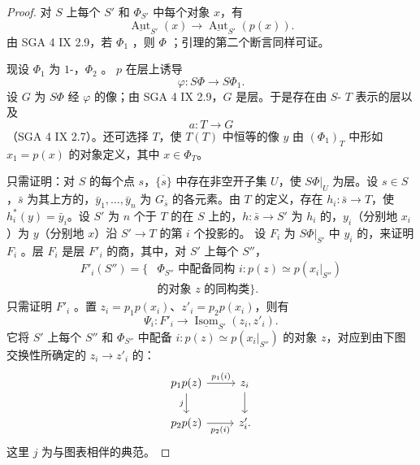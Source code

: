 \begin{proof}
对 $S$ 上每个 $S'$ 和 $\Phi_{S'}$ 中每个对象 $x$，有
\[\underline{\operatorname{Aut}}_{S'}(x)\longrightarrow\underline{\operatorname{Aut}}_{S'}(p(x)).\]
由 SGA 4 IX 2.9，若 $\Phi_1$ ，则 $\Phi$ ；引理的第二个断言同样可证。

现设 $\Phi_1$ 为 $1$-，$\Phi_2$ 。 $p$ 在层上诱导
\[\varphi:S\Phi\longrightarrow S\Phi_1.\]
设 $G$ 为 $S\Phi$ 经 $\varphi$ 的像；由 SGA 4 IX 2.9，$G$ 是层。于是存在由 $S$- $T$ 表示的层以及
\[a:T\longrightarrow G\]
（SGA 4 IX 2.7）。还可选择 $T$，使 $T(T)$ 中恒等的像 $y$ 由 $(\Phi_1)_T$ 中形如 $x_1=p(x)$ 的对象定义，其中 $x\in\Phi_T$。

只需证明：对 $S$ 的每个点 $s$，$\overline{\{s\}}$ 中存在非空开子集 $U$，使 $S\Phi|_U$ 为层。设 $s\in S$，$\bar s$ 为其上方的，$\bar y_1,\ldots,\bar y_n$ 为 $G_{\bar s}$ 的各元素。由 $T$ 的定义，存在 $h_i:\bar s\to T$，使 $h_i^*(y)=\bar y_i$。设 $S'$ 为 $n$ 个于 $T$ 的在 $S$ 上的，$h:\bar s\to S'$ 为 $h_i$ 的，$y_i$（分别地 $x_i$）为 $y$（分别地 $x$）沿 $S'\to T$ 的第 $i$ 个投影的。
设 $F_i$ 为 $S\Phi|_{S'}$ 中 $y_i$ 的，来证明 $F_i$ 。层 $F_i$ 是层 $F'_i$ 的商，其中，对 $S'$ 上每个 $S''$，
\[
\begin{aligned}
F'_i(S'')=\{&\Phi_{S''}\text{ 中配备同构 }i:p(z)\simeq p(x_i|_{S''})\\
&\text{的对象 }z\text{ 的同构类}\}.
\end{aligned}
\]
只需证明 $F'_i$ 。置 $z_i=p_1p(x_i)$、$z'_i=p_2p(x_i)$，则有
\[\Psi_i:F'_i\longrightarrow\underline{\operatorname{Isom}}_{S'}(z_i,z'_i).\]
它将 $S'$ 上每个 $S''$ 和 $\Phi_{S''}$ 中配备 $i:p(z)\simeq p(x_i|_{S''})$ 的对象 $z$，对应到由下图交换性所确定的 $z_i\to z'_i$ 的：
\[
\begin{tikzcd}
p_1p(z)\arrow[r,"p_1(i)"]\arrow[d,"j"']&z_i\arrow[d]\\
p_2p(z)\arrow[r,"p_2(i)"']&z'_i.
\end{tikzcd}
\]
这里 $j$ 为与图表相伴的典范。


\end{proof}
